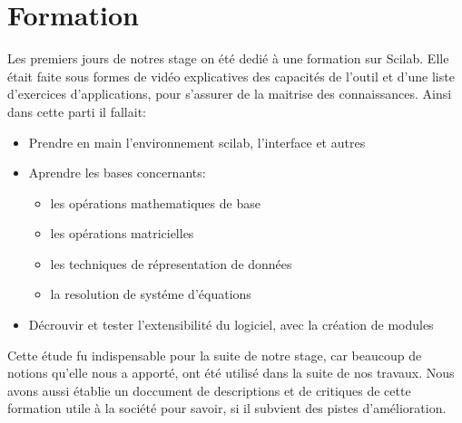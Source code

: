 \section*{Formation}
Les premiers jours de notres stage on été dedié à une formation sur Scilab.
Elle était faite sous formes de vidéo explicatives des capacités de l'outil et
d'une liste d'exercices d'applications, pour s'assurer de la
maitrise des connaissances.
Ainsi dans cette parti il fallait:
\begin{itemize}
\item Prendre en main l'environnement scilab, l'interface et autres
\item Aprendre les bases concernants:
	\begin{itemize}
		\item les opérations mathematiques de base
		\item les opérations matricielles
		\item les techniques de répresentation de données
		\item la resolution de systéme d'équations
	\end{itemize}
\item Décrouvir et tester l'extensibilité du logiciel, avec la création de modules
\end{itemize}
Cette étude fu indispensable pour la suite de notre stage, car beaucoup de
notions qu'elle nous a apporté, ont été utilisé dans la suite de nos  travaux.
Nous avons aussi établie un doccument de descriptions et de critiques de cette formation
utile à la société pour savoir, si il subvient des pistes d'amélioration.




